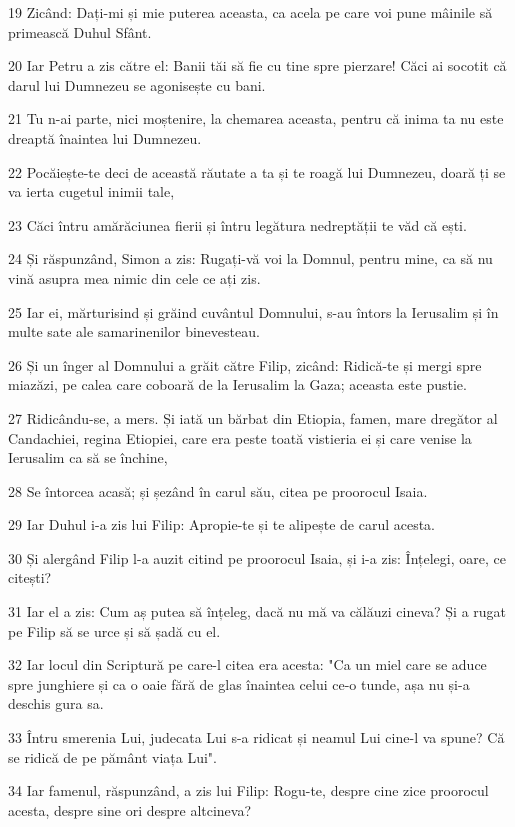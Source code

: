 \par 19 Zicând: Dați-mi și mie puterea aceasta, ca acela pe care voi pune mâinile să primească Duhul Sfânt.
\par 20 Iar Petru a zis către el: Banii tăi să fie cu tine spre pierzare! Căci ai socotit că darul lui Dumnezeu se agonisește cu bani.
\par 21 Tu n-ai parte, nici moștenire, la chemarea aceasta, pentru că inima ta nu este dreaptă înaintea lui Dumnezeu.
\par 22 Pocăiește-te deci de această răutate a ta și te roagă lui Dumnezeu, doară ți se va ierta cugetul inimii tale,
\par 23 Căci întru amărăciunea fierii și întru legătura nedreptății te văd că ești.
\par 24 Și răspunzând, Simon a zis: Rugați-vă voi la Domnul, pentru mine, ca să nu vină asupra mea nimic din cele ce ați zis.
\par 25 Iar ei, mărturisind și grăind cuvântul Domnului, s-au întors la Ierusalim și în multe sate ale samarinenilor binevesteau.
\par 26 Și un înger al Domnului a grăit către Filip, zicând: Ridică-te și mergi spre miazăzi, pe calea care coboară de la Ierusalim la Gaza; aceasta este pustie.
\par 27 Ridicându-se, a mers. Și iată un bărbat din Etiopia, famen, mare dregător al Candachiei, regina Etiopiei, care era peste toată vistieria ei și care venise la Ierusalim ca să se închine,
\par 28 Se întorcea acasă; și șezând în carul său, citea pe proorocul Isaia.
\par 29 Iar Duhul i-a zis lui Filip: Apropie-te și te alipește de carul acesta.
\par 30 Și alergând Filip l-a auzit citind pe proorocul Isaia, și i-a zis: Înțelegi, oare, ce citești?
\par 31 Iar el a zis: Cum aș putea să înțeleg, dacă nu mă va călăuzi cineva? Și a rugat pe Filip să se urce și să șadă cu el.
\par 32 Iar locul din Scriptură pe care-l citea era acesta: "Ca un miel care se aduce spre junghiere și ca o oaie fără de glas înaintea celui ce-o tunde, așa nu și-a deschis gura sa.
\par 33 Întru smerenia Lui, judecata Lui s-a ridicat și neamul Lui cine-l va spune? Că se ridică de pe pământ viața Lui".
\par 34 Iar famenul, răspunzând, a zis lui Filip: Rogu-te, despre cine zice proorocul acesta, despre sine ori despre altcineva?
